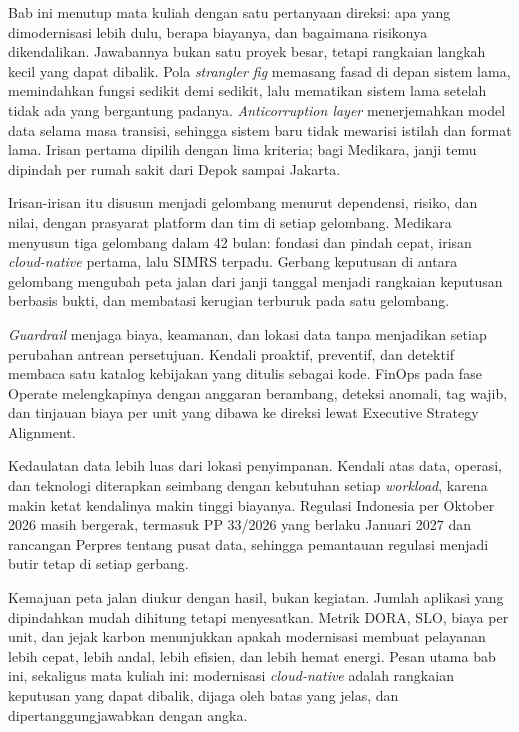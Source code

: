 Bab ini menutup mata kuliah dengan satu pertanyaan direksi: apa yang dimodernisasi lebih dulu,
berapa biayanya, dan bagaimana risikonya dikendalikan. Jawabannya bukan satu proyek besar, tetapi
rangkaian langkah kecil yang dapat dibalik. Pola \textit{strangler fig} memasang fasad di depan
sistem lama, memindahkan fungsi sedikit demi sedikit, lalu mematikan sistem lama setelah tidak ada
yang bergantung padanya. \textit{Anticorruption layer} menerjemahkan model data selama masa
transisi, sehingga sistem baru tidak mewarisi istilah dan format lama. Irisan pertama dipilih
dengan lima kriteria; bagi Medikara, janji temu dipindah per rumah sakit dari Depok sampai Jakarta.

Irisan-irisan itu disusun menjadi gelombang menurut dependensi, risiko, dan nilai, dengan prasyarat
platform dan tim di setiap gelombang. Medikara menyusun tiga gelombang dalam 42 bulan: fondasi dan
pindah cepat, irisan \textit{cloud-native} pertama, lalu SIMRS terpadu. Gerbang keputusan di antara
gelombang mengubah peta jalan dari janji tanggal menjadi rangkaian keputusan berbasis bukti, dan
membatasi kerugian terburuk pada satu gelombang.

\textit{Guardrail} menjaga biaya, keamanan, dan lokasi data tanpa menjadikan setiap perubahan
antrean persetujuan. Kendali proaktif, preventif, dan detektif membaca satu katalog kebijakan yang
ditulis sebagai kode. FinOps pada fase Operate melengkapinya dengan anggaran berambang, deteksi
anomali, tag wajib, dan tinjauan biaya per unit yang dibawa ke direksi lewat Executive Strategy
Alignment.

Kedaulatan data lebih luas dari lokasi penyimpanan. Kendali atas data, operasi, dan teknologi
diterapkan seimbang dengan kebutuhan setiap \textit{workload}, karena makin ketat kendalinya makin
tinggi biayanya. Regulasi Indonesia per Oktober 2026 masih bergerak, termasuk PP 33/2026 yang
berlaku Januari 2027 dan rancangan Perpres tentang pusat data, sehingga pemantauan regulasi menjadi
butir tetap di setiap gerbang.

Kemajuan peta jalan diukur dengan hasil, bukan kegiatan. Jumlah aplikasi yang dipindahkan mudah
dihitung tetapi menyesatkan. Metrik DORA, SLO, biaya per unit, dan jejak karbon menunjukkan apakah
modernisasi membuat pelayanan lebih cepat, lebih andal, lebih efisien, dan lebih hemat energi.
Pesan utama bab ini, sekaligus mata kuliah ini: modernisasi \textit{cloud-native} adalah rangkaian
keputusan yang dapat dibalik, dijaga oleh batas yang jelas, dan dipertanggungjawabkan dengan angka.

